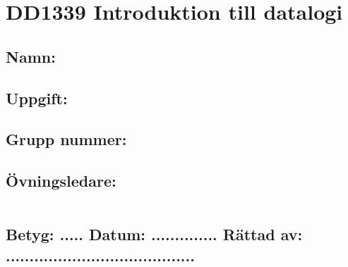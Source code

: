 
\thispagestyle{empty}
\section*{DD1339 Introduktion till datalogi}

\vspace{10mm}

\subsection*{Namn: \emph{\theauthor} }

\vspace{3mm}

\subsection*{Uppgift: \homeworknumber}

\vspace{3mm}

\subsection*{Grupp nummer: \groupnumber }

\vspace{3mm}

\subsection*{Övningsledare: \courseassistant }


\vspace{10mm}

\begin{tabular}{l}
 \hspace{140mm} \\
\hline \hline
\end{tabular}

\vspace{5mm}

\subsection*{Betyg: ..... \hspace{2mm}  Datum: .............. \hspace{2mm} Rättad av: ........................................}


%
